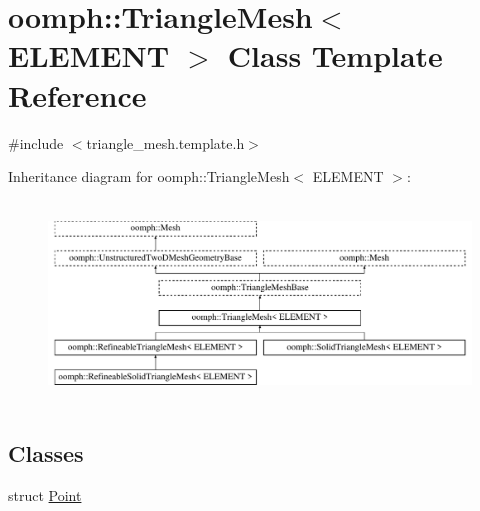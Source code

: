 \hypertarget{classoomph_1_1TriangleMesh}{}\section{oomph\+:\+:Triangle\+Mesh$<$ E\+L\+E\+M\+E\+NT $>$ Class Template Reference}
\label{classoomph_1_1TriangleMesh}


{\ttfamily \#include $<$triangle\+\_\+mesh.\+template.\+h$>$}

Inheritance diagram for oomph\+:\+:Triangle\+Mesh$<$ E\+L\+E\+M\+E\+NT $>$\+:\begin{figure}[H]
\begin{center}
\leavevmode
\includegraphics[height=5.419354cm]{classoomph_1_1TriangleMesh}
\end{center}
\end{figure}
\subsection*{Classes}
\begin{DoxyCompactItemize}
\item 
struct \hyperlink{structoomph_1_1TriangleMesh_1_1Point}{Point}
\end{DoxyCompactItemize}
